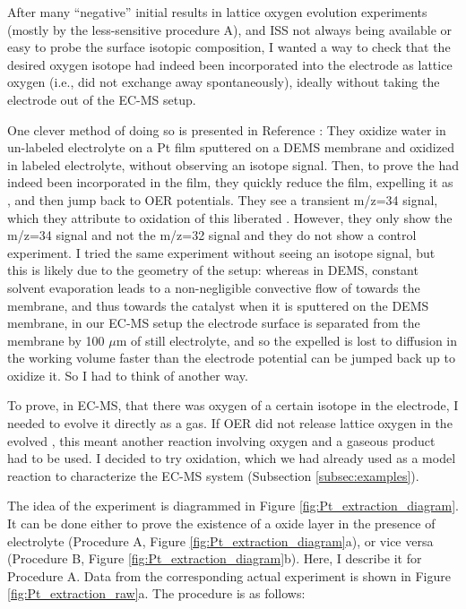 After many ``negative'' initial results in lattice oxygen evolution experiments (mostly by the less-sensitive procedure A), and ISS not always being available or easy to probe the surface isotopic composition, I wanted a way to check that the desired oxygen isotope had indeed been incorporated into the electrode as lattice oxygen (i.e., did not exchange away spontaneously), ideally without taking the electrode out of the EC-MS setup. 

One clever method of doing so is presented in Reference : They oxidize water in un-labeled electrolyte on a Pt film sputtered on a DEMS membrane and oxidized in labeled electrolyte, without observing an isotope signal. Then, to prove the  had indeed been incorporated in the film, they quickly reduce the film, expelling it as , and then jump back to OER potentials. They see a transient m/z=34 signal, which they attribute to oxidation of this liberated . However, they only show the m/z=34 signal and not the m/z=32 signal and they do not show a control experiment. I tried the same experiment without seeing an isotope signal, but this is likely due to the geometry of the setup: whereas in DEMS, constant solvent evaporation leads to a non-negligible convective flow of  towards the membrane, and thus towards the catalyst when it is sputtered on the DEMS membrane, in our EC-MS setup the electrode surface is separated from the membrane by 100 $\mu$m of still electrolyte, and so the expelled  is lost to diffusion in the working volume faster than the electrode potential can be jumped back up to oxidize it. So I had to think of another way.

To prove, in EC-MS, that there was oxygen of a certain isotope in the electrode, I needed to evolve it directly as a gas. If OER did not release lattice oxygen in the evolved , this meant another reaction involving oxygen and a gaseous product had to be used. I decided to try  oxidation, which we had already used as a model reaction to characterize the EC-MS system (Subsection \ref{subsec:examples}). 

The idea of the experiment is diagrammed in Figure \ref{fig:Pt_extraction_diagram}. It can be done either to prove the existence of a  oxide layer in the presence of  electrolyte (Procedure A, Figure \ref{fig:Pt_extraction_diagram}a), or vice versa (Procedure B, Figure \ref{fig:Pt_extraction_diagram}b). Here, I describe it for Procedure A. Data from the corresponding actual experiment is shown in Figure \ref{fig:Pt_extraction_raw}a. The procedure is as follows:


